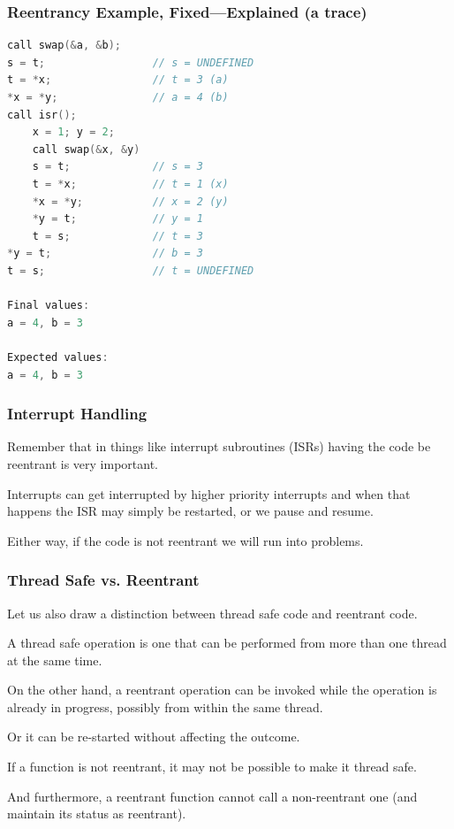\begin{frame}[fragile]
  \frametitle{Reentrancy Example, Fixed---Explained (a trace)}

  
  \begin{lstlisting}[language=C]
call swap(&a, &b);
s = t;                 // s = UNDEFINED
t = *x;                // t = 3 (a)
*x = *y;               // a = 4 (b)
call isr();
    x = 1; y = 2;
    call swap(&x, &y)
    s = t;             // s = 3
    t = *x;            // t = 1 (x)
    *x = *y;           // x = 2 (y)
    *y = t;            // y = 1
    t = s;             // t = 3
*y = t;                // b = 3
t = s;                 // t = UNDEFINED

Final values:
a = 4, b = 3

Expected values:
a = 4, b = 3
  \end{lstlisting}
  
\end{frame}

\begin{frame}
\frametitle{Interrupt Handling}


Remember that in things like interrupt subroutines (ISRs) having the code be reentrant is very important. 

Interrupts can get interrupted by higher priority interrupts and when that happens the ISR may simply be restarted, or we pause and resume.

Either way, if the code is not reentrant we will run into problems.


\end{frame}

\begin{frame}
\frametitle{Thread Safe vs. Reentrant}

Let us also draw a distinction between thread safe code and reentrant code. 

A thread safe operation is one that can be performed from more than one thread at the same time. 

On the other hand, a reentrant operation can be invoked while the operation is already in progress, possibly from within the same thread. 

Or it can be re-started without affecting the outcome. 

If a function is not reentrant, it may not be possible to make it thread safe. 

And furthermore, a reentrant function cannot call a non-reentrant one (and maintain its status as reentrant).

\end{frame}



